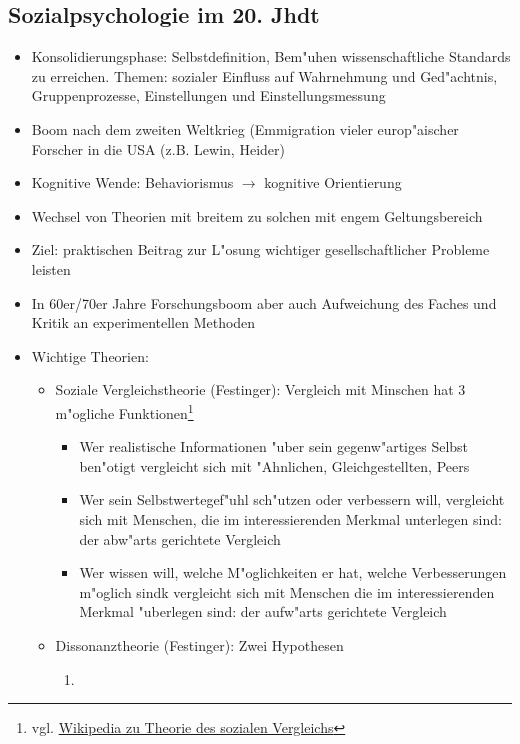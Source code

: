 \subsection{Sozialpsychologie im 20. Jhdt}
\begin{itemize}
	\item
		Konsolidierungsphase: Selbstdefinition, Bem"uhen wissenschaftliche Standards zu erreichen. Themen: sozialer Einfluss auf Wahrnehmung und Ged"achtnis, Gruppenprozesse, Einstellungen und Einstellungsmessung
	\item

		Boom nach dem zweiten Weltkrieg (Emmigration vieler europ"aischer Forscher in die USA (z.B. Lewin, Heider)
	\item
		Kognitive Wende: Behaviorismus  $\rightarrow$ kognitive Orientierung
	\item
		Wechsel von Theorien mit breitem zu solchen mit engem Geltungsbereich
	\item
		Ziel: praktischen Beitrag zur L"osung wichtiger gesellschaftlicher Probleme leisten
	\item
		In 60er/70er Jahre Forschungsboom aber auch Aufweichung des Faches und Kritik an experimentellen Methoden
	\item
		Wichtige Theorien:
		\begin{itemize}
			\item
				Soziale Vergleichstheorie (Festinger): Vergleich mit Minschen hat 3 m"ogliche Funktionen\footnote{vgl. \href{https://de.wikipedia.org/wiki/Theorie_des_sozialen_Vergleichs}{Wikipedia zu Theorie des sozialen Vergleichs}}
				\begin{itemize}
					\item
						Wer realistische Informationen "uber sein gegenw"artiges Selbst ben"otigt vergleicht sich mit "Ahnlichen, Gleichgestellten, Peers
					\item
						Wer sein Selbstwertegef"uhl sch"utzen oder verbessern will, vergleicht sich mit Menschen, die im interessierenden Merkmal unterlegen sind: der abw"arts gerichtete Vergleich
					\item
						Wer wissen will, welche M"oglichkeiten er hat, welche Verbesserungen m"oglich sindk vergleicht sich mit Menschen die im interessierenden Merkmal "uberlegen sind: der aufw"arts gerichtete Vergleich
				\end{itemize}
			\item
				Dissonanztheorie (Festinger): Zwei Hypothesen
				\begin{enumerate}
					\item

\end{enumerate}
\end{itemize}
\end{itemize}
